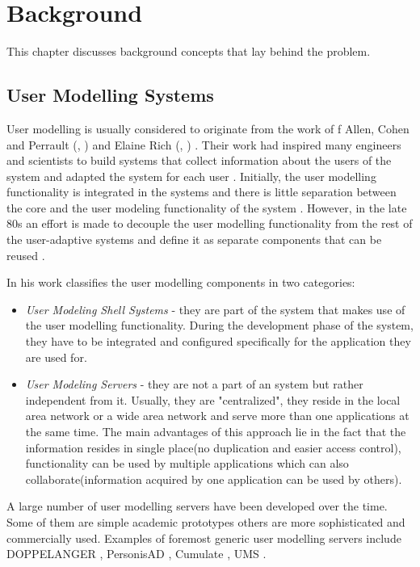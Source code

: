 
\chapter{\label{cha:background}Background}
This chapter discusses background concepts that lay behind the problem.

\section{User Modelling Systems}

User modelling is usually considered to originate from the work of f Allen, Cohen and Perrault (\cite{Allen}, \cite{Cohen}) and Elaine Rich (\cite{Rich1}, \cite{Rich2}) \cite{Kobsa}. Their work had inspired many engineers and scientists to build systems that collect information about the users of the system and adapted the system for each user \cite{Kobsa89}. Initially, the user modelling functionality is integrated in the systems and there is little separation between the core and the user modeling functionality of the system \cite{Kobsa}. However, in the late 80s an effort is made to decouple the user modelling functionality from the rest of the user-adaptive systems and define it as separate components that can be reused \cite{Kobsa}. 

In his work \cite{Kobsa} classifies the user modelling components in two categories:
\begin{itemize}
	\item \textit{User Modeling Shell Systems} - they are part of the system that makes use of the user modelling functionality. During the development phase of the system, they have to be integrated and configured specifically for the application they are used for.
	\item \textit{User Modeling Servers} - they are not a part of an system but rather independent from it. Usually, they are "centralized", they reside in the local area network or a wide area network and serve more than one applications at the same time. The main advantages of this approach lie in the fact that the information resides in single place(no duplication and easier access control), functionality can be used by multiple applications which can also collaborate(information acquired by one application can be used by others).
\end{itemize}

A large number of user modelling servers have been developed over the time. Some of them are simple academic prototypes others are more sophisticated and commercially used. Examples of foremost generic user modelling servers include DOPPELANGER \cite{Orwant95}, PersonisAD \cite{Assad07}, Cumulate \cite{Brusilovsky04}, UMS \cite{Kobsa06}.

